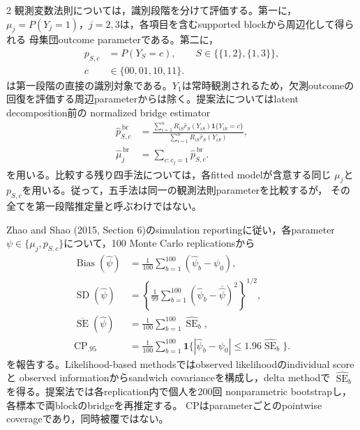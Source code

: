 \documentclass[a4paper,10pt]{article}
\begin{document}
\begin{multicols}{2}
観測変数法則については，識別段階を分けて評価する。第一に，
$\mu_j=P(Y_j=1)$，$j=2,3$は，各項目を含むsupported blockから周辺化して得られる
母集団outcome parameterである。第二に，
\begin{equation}
\begin{aligned}
p_{S,c}&=P(Y_S=c),\qquad
S\in\{\{1,2\},\{1,3\}\},\\
c&\in\{00,01,10,11\}.
\end{aligned}
\label{eq:simulation-observed-law-targets}
\end{equation}
は第一段階の直接の識別対象である。$Y_1$は常時観測されるため，欠測outcomeの
回復を評価する周辺parameterからは除く。提案法についてはlatent decomposition前の
normalized bridge estimator
\begin{equation}
\begin{aligned}
\widehat p^{\,\mathrm{br}}_{S,c}
&=\frac{\sum_{i=1}^n R_{iS}\widehat r_S(Y_{iS})
\mathbf{1}\{Y_{iS}=c\}}
{\sum_{i=1}^n R_{iS}\widehat r_S(Y_{iS})},\\
\widehat\mu^{\,\mathrm{br}}_j
&=\sum_{c:c_j=1}\widehat p^{\,\mathrm{br}}_{S,c}.
\end{aligned}
\label{eq:simulation-stage1-law-estimator}
\end{equation}
を用いる。比較する残り四手法については，各fitted modelが含意する同じ
$\mu_j$と$p_{S,c}$を用いる。従って，五手法は同一の観測法則parameterを比較するが，
その全てを第一段階推定量と呼ぶわけではない。

Zhao and Shao (2015, Section 6)のsimulation reportingに従い，各parameter
$\psi\in\{\mu_j,p_{S,c}\}$について，100 Monte Carlo replicationsから
\begin{equation}
\begin{aligned}
\operatorname{Bias}(\widehat\psi)
&=\frac1{100}\sum_{b=1}^{100}(\widehat\psi_b-\psi_0),\\
\operatorname{SD}(\widehat\psi)
&=\left\{\frac1{99}\sum_{b=1}^{100}
(\widehat\psi_b-\overline{\widehat\psi})^2\right\}^{1/2},\\
\overline{\operatorname{SE}}(\widehat\psi)
&=\frac1{100}\sum_{b=1}^{100}\widehat{\operatorname{SE}}_b,\\
\operatorname{CP}_{.95}
&=\frac1{100}\sum_{b=1}^{100}
\mathbf{1}\{|\widehat\psi_b-\psi_0|
\le1.96\widehat{\operatorname{SE}}_b\}.
\end{aligned}
\label{eq:simulation-inference-criteria}
\end{equation}
を報告する。Likelihood-based methodsではobserved likelihoodのindividual scoreと
observed informationからsandwich covarianceを構成し，delta methodで
$\widehat{\operatorname{SE}}_b$を得る。提案法では各replication内で個人を200回
nonparametric bootstrapし，各標本で両blockのbridgeを再推定する。
CPはparameterごとのpointwise coverageであり，同時被覆ではない。


\end{multicols}
\end{document}
